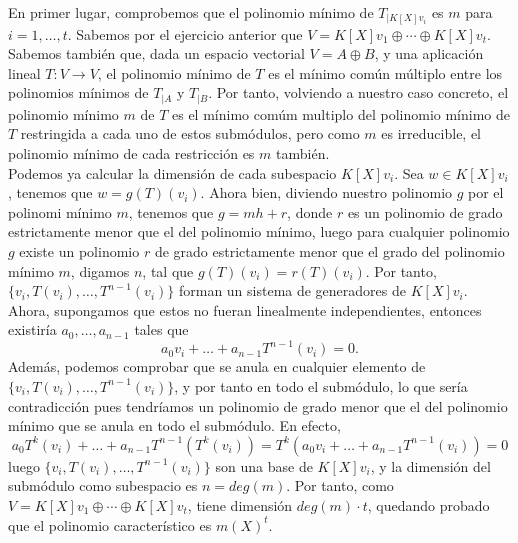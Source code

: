 En primer lugar, comprobemos que el polinomio mínimo de \(T_{|K[X]v_i}\) es \(m\) para \(i = 1, \dots, t\). Sabemos por el ejercicio anterior que \(V = K[X]v_1 \oplus \cdots \oplus K[X]v_t\). Sabemos también que, dada un espacio vectorial \(V = A \oplus B\), y una aplicación lineal \(T:V \rightarrow V\), el polinomio mínimo de \(T\) es el mínimo común múltiplo entre los polinomios mínimos de  \(T_{|A}\) y  \(T_{|B}\). Por tanto, volviendo a nuestro caso concreto, el polinomio mínimo \(m\) de \(T\) es el mínimo comúm multiplo del polinomio mínimo de \(T\) restringida a cada uno de estos submódulos, pero como \(m\) es irreducible, el polinomio mínimo de cada restricción es  \(m\) también.\\

Podemos ya calcular la dimensión de cada subespacio \(K[X]v_i\). Sea \(w \in K[X]v_i\), tenemos que  \(w = g(T)(v_i)\). Ahora bien, diviendo nuestro polinomio  \(g\) por el polinomi mínimo  \(m\), tenemos que  \(g = mh + r\), donde \(r\) es un polinomio de grado estrictamente menor que el del polinomio mínimo, luego para cualquier polinomio \(g\) existe un polinomio \(r\) de grado estrictamente menor que el grado del polinomio mínimo \(m\), digamos \(n\), tal que \(g(T)(v_i) = r(T)(v_i)\). Por tanto, \(\{v_i, T(v_i), \dots, T^{n-1}(v_i)\}\) forman un sistema de generadores de \(K[X]v_i\). \\

Ahora, supongamos que estos no fueran linealmente independientes, entonces existiría \(a_0, \dots, a_{n-1}\) tales que
\[
a_0v_i + \dots + a_{n-1}T^{n-1}(v_i) = 0
.\]
Además, podemos comprobar que se anula en cualquier elemento de \(\{v_i, T(v_i), \dots, T^{n-1}(v_i)\}\), y por tanto en todo el submódulo, lo que sería contradicción pues tendríamos un polinomio de grado menor que el del polinomio mínimo que se anula en todo el submódulo. En efecto,
\[
a_0T^k(v_i) + \dots + a_{n-1}T^{n-1}(T^k(v_i)) = T^k(a_0v_i + \dots + a_{n-1}T^{n-1}(v_i)) = 0
\]
luego \(\{v_i, T(v_i), \dots, T^{n-1}(v_i)\}\) son una base de \(K[X]v_i\), y la dimensión del submódulo como subespacio es \(n = deg(m)\). Por tanto, como \(V = K[X]v_1 \oplus \cdots \oplus K[X]v_t\), tiene dimensión \(deg(m) \cdot t\), quedando probado que el polinomio característico es  \(m(X)^t\).
